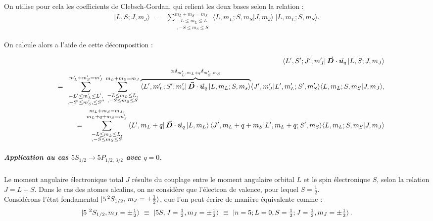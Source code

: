 On utilise pour cela les coefficients de Clebsch-Gordan, qui relient les deux bases selon la relation :
\begin{eqnarray}
	|L, S; J, m_J\rangle  &=& \sum_{\substack{-L \leq m_L \leq L,\\, -S \leq m_S \leq S  }}^{m_L + m_S = m_J} \langle L, m_L; S, m_S | J, m_J \rangle \; |L, m_L; S, m_S\rangle.
\end{eqnarray}

On calcule alors a l'aide de cette décomposition :

\begin{eqnarray}
	&&\bra{L' , S' ; J' , m_J' }  \vec{{\bm{D}}} \cdot \vec{{\bm{u}}}_q 	\ket{L , S ; J , m_J }  \\
	&&~ = ~ \sum_{\substack{-L' \leq m_L' \leq L',\\, -S' \leq m_S', \leq S''}}^{m_L' + m_S'= m_J'}\sum_{\substack{-L \leq m_L \leq L,\\, -S \leq m_S \leq S }}^{m_L + m_S = m_J} \overbrace{\bra{L',m_L';S',m_s'} \vec{{\bm{D}}} \cdot \vec{{\bm{u}}}_q \ket{L,m_L;S,m_s}}^{\propto \delta_{m_L',m_L+q}\delta_{m_S',m_S}} \langle J' , m_J' \vert L' , m_L' ; S' , m_S' \rangle \langle L , m_L ; S , m_S \vert J , m_J \rangle ,\\
	&&~ = ~  \sum_{\substack{-L \leq m_L \leq L,\\, -S \leq m_S \leq S}}^{\substack{ m_L + m_S = m_J, \\ m_L + q + m_S = m_J'}} \bra{L', m_L+q} \vec{{\bm{D}}} \cdot \vec{{\bm{u}}}_q \ket{L,m_L}\langle J' , m_L + q + m_S \vert L' ,  m_L + q  ; S' ,  m_S \rangle \langle L , m_L ; S , m_S \vert J , m_J \rangle
\end{eqnarray}


\subparagraph{Application au cas $5S_{1/2} \rightarrow 5P_{1/2,\,3/2}$ avec $q = 0$.}


Le moment angulaire électronique total $J$ résulte du couplage entre le moment angulaire orbital $L$ et le spin électronique $S$, selon la relation $J = L + S$. Dans le cas des atomes alcalins, on ne considère que l’électron de valence, pour lequel $S = \tfrac12$.\\

Considérons l’état fondamental $\ket{5\,^2S_{1/2},\,m_J = \pm \tfrac12}$, que l’on peut écrire de manière équivalente comme :
\begin{eqnarray*}
	\ket{ 5{~}^2S_{1/2} , m_J = \pm \tfrac12  } ~\equiv~ \ket{ 5S , J=\tfrac12  , m_J= \pm \tfrac12  }  ~\equiv~ \ket{n=5 ; L=0 , S=\tfrac12 ;  J=\tfrac12  , m_J = \pm \tfrac12 }.
\end{eqnarray*}

